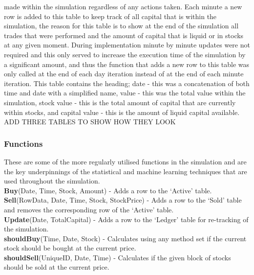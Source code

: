 \documentclass[12pt,a4paper]{article}
\begin{document}
made within the simulation regardless of any actions taken. Each minute a new row is added to this table to keep track of all capital that is within the simulation, the reason for this table is to show at the end of the simulation all trades that were performed and the amount of capital that is liquid or in stocks at any given moment. During implementation minute by minute updates were not required and this only served to increase the execution time of the simulation by a significant amount, and thus the function that adds a new row to this table was only called at the end of each day iteration instead of at the end of each minute iteration. This table contains the heading; date - this was a concatenation of both time and date with a simplified name, value - this was the total value within the simulation, stock value - this is the total amount of capital that are currently within stocks, and capital value - this is the amount of liquid capital available. \\

ADD THREE TABLES TO SHOW HOW THEY LOOK\\
\fi

\subsubsection*{Functions}

These are some of the more regularly utilised functions in the simulation and are the key underpinnings of the statistical and machine learning techniques that are used throughout the simulation. \\

\noindent
\textbf{Buy}(Date, Time, Stock, Amount) - Adds a row to the `Active' table. \\

\noindent
\textbf{Sell}(RowData, Date, Time, Stock, StockPrice) - Adds a row to the `Sold' table and removes the corresponding row of the `Active' table.\\

\noindent
\textbf{Update}(Date, TotalCapital) - Adds a row to the `Ledger' table for re-tracking of the simulation.\\

\noindent
\textbf{shouldBuy}(Time, Date, Stock) - Calculates using any method set if the current stock should be bought at the current price.\\

\noindent
\textbf{shouldSell}(UniqueID, Date, Time) - Calculates if the given block of stocks should be sold at the current price.\\
\end{document}
